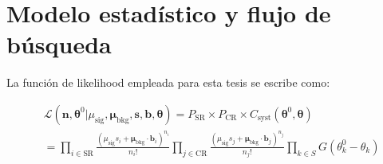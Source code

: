 

\section{Modelo estadístico y flujo de búsqueda}

La función de likelihood empleada para esta tesis se escribe como:


\begin{equation}
	\begin{split}
	& \mathcal{L} (\textbf{n}, \bm{\theta}^0 | \mu_\text{sig}, \bm{\mu}_{\text{bkg}}, \textbf{s}, \textbf{b}, \bm{\theta}) = P_\text{SR} \times P_\text{CR} \times  C_\text{syst} (\bm{\theta}^0, \bm{\theta}) \\
	& = \prod_{i \in \text{SR}} \frac{(\mu_\text{sig} s_i + \bm{\mu}_{\text{bkg}} \cdot \textbf{b}_i)^{n_i}}{n_i!} \prod_{j \in \text{CR}} \frac{(\mu_\text{sig} s_j + \bm{\mu}_{\text{bkg}} \cdot \textbf{b}_j)^{n_j}}{n_j!} \prod_{k \in S} G(\theta_k^0 - \theta_k) \\
	\end{split}
	\label{eq:analysis_lh}
\end{equation}


